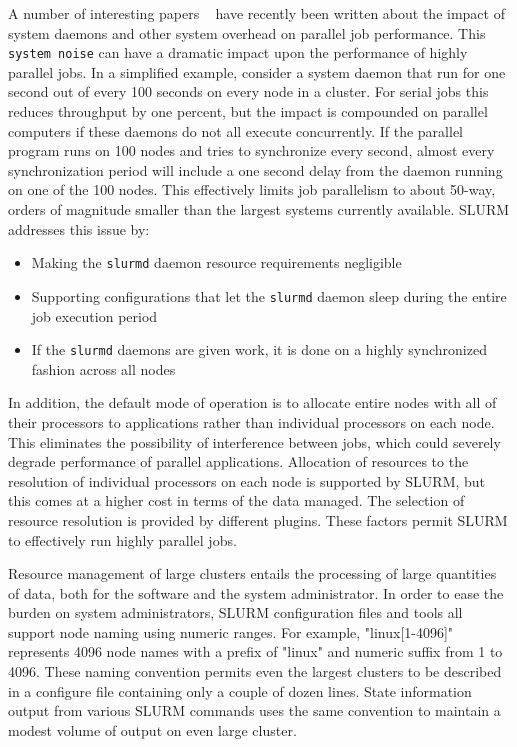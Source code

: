 \documentclass[10pt,twocolumn,times]{../common/llncs}
\begin{document}
{A number of interesting papers 
~\cite{Jones2003,Kerbyson2001,Petrini2003,Phillips2003,Tsafrir2005}
have recently been written about
the impact of system daemons and other system overhead on 
parallel job performance. This {\tt system noise} can have a 
dramatic impact upon the performance of highly parallel jobs. 
In a simplified example, consider a system daemon that run for 
one second out of every 100 seconds on every node in a cluster. 
For serial jobs this 
reduces throughput by one percent, but the impact is compounded 
on parallel computers if these daemons do not all execute concurrently. 
If the parallel program runs on 100 nodes and tries to synchronize 
every second, almost every synchronization period will include a
one second delay from the daemon running on one of the 100 nodes. 
This effectively limits job parallelism to about 50-way, orders 
of magnitude smaller than the largest systems currently available.
SLURM addresses this issue by:
\begin{itemize}
\item Making the {\tt slurmd} daemon resource requirements negligible 
\item Supporting configurations that let the {\tt slurmd} daemon sleep 
during the entire job execution period
\item If the {\tt slurmd} daemons are given work, it is done on a 
highly synchronized fashion across all nodes
\end{itemize}
In addition, the default mode of operation is to allocate entire 
nodes with all of their processors to applications rather than 
individual processors on each node. 
This eliminates the possibility of interference between jobs, 
which could severely degrade performance of parallel applications.
Allocation of resources to the resolution of individual processors 
on each node is supported by SLURM, but this comes at a higher cost 
in terms of the data managed.
The selection of resource resolution is provided by different plugins.
These factors permit SLURM to effectively run highly parallel jobs.

Resource management of large clusters entails the processing of 
large quantities of data, both for the software and the 
system administrator.
In order to ease the burden on system administrators, SLURM 
configuration files and tools all support node naming using
numeric ranges.
For example, "linux[1-4096]" represents 4096 node names with 
a prefix of "linux" and numeric suffix from 1 to 4096. 
These naming convention permits even the largest clusters 
to be described in a configure file containing only a 
couple of dozen lines. 
State information output from various SLURM commands uses
the same convention to maintain a modest volume of output
on even large cluster. 

}
\end{document}

